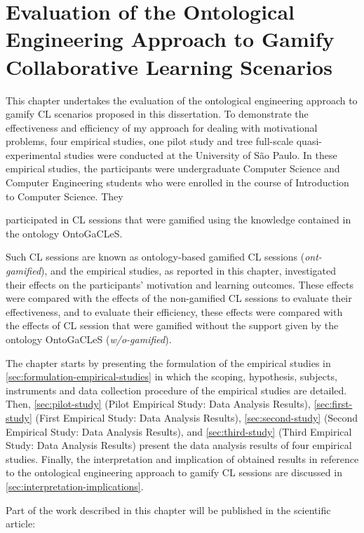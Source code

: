 \chapter[Evaluation of the Ontological Engineering Approach to Gamify CL Scenarios]
{Evaluation of the Ontological Engineering Approach to Gamify Collaborative Learning Scenarios}
\label{chapter:evaluation}

This chapter undertakes the evaluation of the ontological engineering approach to gamify CL scenarios proposed in this dissertation.
To demonstrate the effectiveness and efficiency of my approach for dealing with motivational problems, four empirical studies, one pilot study and tree full-scale quasi-experimental studies were conducted at the University of São Paulo.
In these empirical studies, the participants were undergraduate Computer Science and Computer Engineering students who were enrolled in the course of Introduction to Computer Science.
They 


participated in CL sessions that were gamified using the knowledge contained in the ontology OntoGaCLeS.

Such CL sessions are known as ontology-based gamified CL sessions (\emph{ont-gamified}), and the empirical studies, as reported in this chapter, investigated their effects on the participants' motivation and learning outcomes. These effects were compared with the effects of the non-gamified CL sessions to evaluate their effectiveness, and to evaluate their efficiency, these effects were compared with the effects of CL session that were gamified without the support given by the ontology OntoGaCLeS (\emph{w/o-gamified}).

The chapter starts by presenting the formulation of the empirical studies in \autoref{sec:formulation-empirical-studies} in which the scoping, hypothesis, subjects, instruments and data collection procedure of the empirical studies are detailed. Then, \autoref{sec:pilot-study} (Pilot Empirical Study: Data Analysis Results), \autoref{sec:first-study} (First Empirical Study: Data Analysis Results), \autoref{sec:second-study} (Second Empirical Study: Data Analysis Results), and \autoref{sec:third-study} (Third Empirical Study: Data Analysis Results) present the data analysis results of four empirical studies. Finally, the interpretation and implication of obtained results in reference to the ontological engineering approach to gamify CL sessions are discussed in \autoref{sec:interpretation-implications}.

Part of the work described in this chapter will be published in the scientific article:

